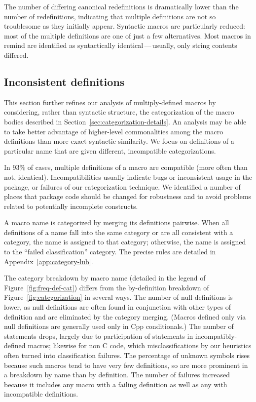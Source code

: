 \documentclass[10pt]{article}
\newcommand{\pkg}[1]{\textsf{#1}}
\begin{document}
The number of differing canonical redefinitions is dramatically lower than
the number of redefinitions, indicating that multiple definitions are not
so troublesome as they initially appear.  Syntactic macros are particularly
reduced: most of the multiple definitions are one of just a few
alternatives.  Most macros in \pkg{remind} are identified as syntactically
identical\,---\,usually, only string contents differed.


\subsection{Inconsistent definitions}
\label{sec:inconsistent}


This section further refines our analysis of multiply-defined macros by
considering, rather than syntactic structure, the categorization of the
macro bodies described in Section~\ref{sec:categorization-details}.  An
analysis may be able to take better advantage of higher-level commonalities
among the macro definitions than more exact syntactic similarity.  We focus
on definitions of a particular name that are given different, incompatible
categorizations.


In 93\% of cases, multiple definitions of a macro are compatible (more
often than not, identical).  Incompatibilities usually indicate bugs or
inconsistent usage in the package, or failures of our categorization
technique.  We identified a number of places that package code should be
changed for robustness and to avoid problems related to potentially
incomplete constructs.

A macro name is categorized by merging its definitions pairwise.  When all
definitions of a name fall into the same category or are all consistent
with a category, the name is assigned to that category; otherwise, the name
is assigned to the ``failed classification'' category.  The precise rules
are detailed in Appendix~\ref{app:category-lub}.

The category breakdown by macro name (detailed in the legend of
Figure~\ref{fig:freq-def-cat}) differs from the by-definition breakdown of
Figure~\ref{fig:categorization} in several ways.  The number of null
definitions is lower, as null definitions are often found in conjunction
with other types of definition and are eliminated by the category merging.
(Macros defined only via null definitions are generally used only in Cpp
conditionals.)  The number of statements drops, largely due to
participation of statements in incompatibly-defined macros; likewise for
non C code, which misclassifications by our heuristics often turned into
classification failures.  The percentage of unknown symbols rises because
such macros tend to have very few definitions, so are more prominent in a
breakdown by name than by definition.  The number of failures increased
because it includes any macro with a failing definition as well as any with
incompatible definitions.
\end{document}
